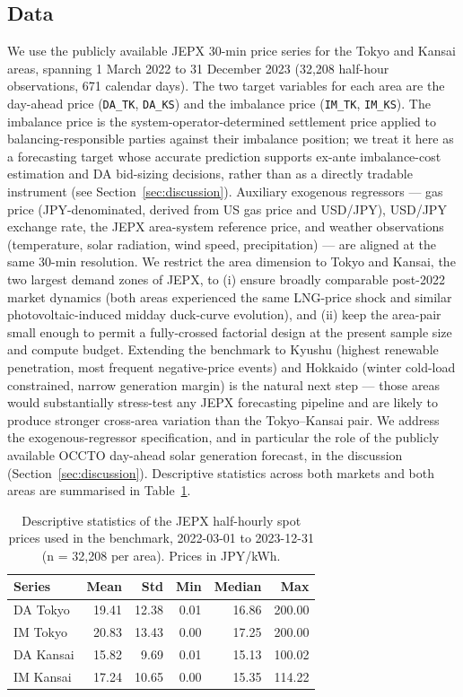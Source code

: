 \documentclass[review,3p,times,authoryear]{elsarticle}
\begin{document}
\subsection{Data}\label{sec:data}
We use the publicly available JEPX 30-min price series for the Tokyo and Kansai areas, spanning 1 March 2022 to 31 December 2023 (32{,}208 half-hour observations, 671 calendar days). The two target variables for each area are the day-ahead price (\texttt{DA\_TK}, \texttt{DA\_KS}) and the imbalance price (\texttt{IM\_TK}, \texttt{IM\_KS}). The imbalance price is the system-operator-determined settlement price applied to balancing-responsible parties against their imbalance position; we treat it here as a forecasting target whose accurate prediction supports ex-ante imbalance-cost estimation and DA bid-sizing decisions, rather than as a directly tradable instrument (see Section~\ref{sec:discussion}). Auxiliary exogenous regressors --- gas price (JPY-denominated, derived from US gas price and USD/JPY), USD/JPY exchange rate, the JEPX area-system reference price, and weather observations (temperature, solar radiation, wind speed, precipitation) --- are aligned at the same 30-min resolution. We restrict the area dimension to Tokyo and Kansai, the two largest demand zones of JEPX, to (i) ensure broadly comparable post-2022 market dynamics (both areas experienced the same LNG-price shock and similar photovoltaic-induced midday duck-curve evolution), and (ii) keep the area-pair small enough to permit a fully-crossed factorial design at the present sample size and compute budget. Extending the benchmark to Kyushu (highest renewable penetration, most frequent negative-price events) and Hokkaido (winter cold-load constrained, narrow generation margin) is the natural next step --- those areas would substantially stress-test any JEPX forecasting pipeline and are likely to produce stronger cross-area variation than the Tokyo--Kansai pair. We address the exogenous-regressor specification, and in particular the role of the publicly available OCCTO day-ahead solar generation forecast, in the discussion (Section~\ref{sec:discussion}). Descriptive statistics across both markets and both areas are summarised in Table~\ref{tab:desc}.

\begin{table}[t]
\centering
\caption{Descriptive statistics of the JEPX half-hourly spot prices used in the benchmark, 2022-03-01 to 2023-12-31 (n = 32{,}208 per area). Prices in JPY/kWh.}\label{tab:desc}
\begin{tabular}{lrrrrr}
\toprule
Series & Mean & Std & Min & Median & Max \\
\midrule
DA Tokyo  & 19.41 & 12.38 & 0.01 & 16.86 & 200.00 \\
IM Tokyo  & 20.83 & 13.43 & 0.00 & 17.25 & 200.00 \\
DA Kansai & 15.82 &  9.69 & 0.01 & 15.13 & 100.02 \\
IM Kansai & 17.24 & 10.65 & 0.00 & 15.35 & 114.22 \\
\bottomrule
\end{tabular}
\end{table}
\end{document}
